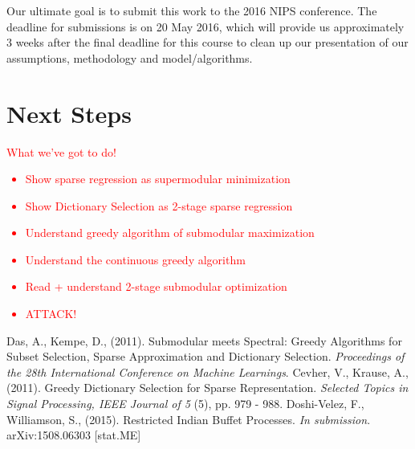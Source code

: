 \documentclass{article}
\begin{document}
Our ultimate goal is to submit this work to the 2016 NIPS conference. The deadline for submissions is on 20 May 2016, which will provide us approximately 3 weeks after the final deadline for this course to clean up our presentation of our assumptions, methodology and model/algorithms.

\section{Next Steps} \label{next steps}

\textcolor{red}{What we've got to do!
\begin{itemize}
\item{Show sparse regression as supermodular minimization}
\item{Show Dictionary Selection as 2-stage sparse regression}
\item{Understand greedy algorithm of submodular maximization}
\item{Understand the continuous greedy algorithm}
\item{Read + understand 2-stage submodular optimization}
\item{ATTACK!}
\end{itemize}}


\begin{thebibliography}{99}
  Das, A., Kempe, D., (2011). Submodular meets Spectral: Greedy Algorithms for Subset Selection, Sparse Approximation and Dictionary Selection. \textit{Proceedings of the 28th International Conference on Machine Learnings}.
  Cevher, V., Krause, A., (2011). Greedy Dictionary Selection for Sparse Representation. \textit{Selected Topics in Signal Processing, IEEE Journal of 5} (5), pp. 979 - 988.
  Doshi-Velez, F., Williamson, S., (2015). Restricted Indian Buffet Processes. \textit{In submission}. arXiv:1508.06303 [stat.ME]
  
\end{thebibliography}
\end{document}
